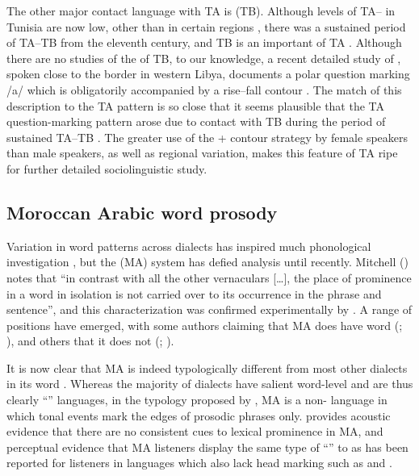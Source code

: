 \documentclass[output=paper]{langsci/langscibook}
\begin{document}
The other major contact language with TA is   (TB). Although levels of TA--  in Tunisia are now low, other than in certain regions \citep{Gabsi2011}, there was a sustained period of TA--TB  from the eleventh century, and TB is an important  of TA \citep{Daoud2007}. Although there are no studies of the  of TB, to our knowledge, a recent detailed study of  , spoken close to the  border in western Libya, documents a polar question marking  /a/ which is obligatorily accompanied by a rise--fall contour \citep{Gussenhoven2017}. The match of this description to the TA pattern is so close that it seems plausible that the TA question-marking pattern arose due to contact with TB during the period of sustained TA--TB . The greater use of the  + contour strategy by female speakers than male speakers, as well as regional variation, makes this feature of TA ripe for further detailed sociolinguistic study.


 
 \subsection{Moroccan Arabic word prosody} \label{moroc}


Variation in word  patterns across  dialects has inspired much phonological investigation \citep{Watson2011stress}, but the   (MA)  system has defied analysis until recently. Mitchell (\citeyear[202]{Mitchell1993}) notes that “in contrast with all the other vernaculars […], the place of prominence in a word in isolation is not carried over to its occurrence in the phrase and sentence”, and this characterization was confirmed experimentally by \citet{Boudlal2001}. A range of positions have emerged, with some authors claiming that MA does have word  (\citealt{Benkirane1998}; \citealt{BurdinEtAl2014}), and others that it does not (\citealt{Maas2013}; \citealt{ElZarka2012}). 

It is now clear that MA is indeed typologically different from most other  dialects in its word . Whereas the majority of  dialects have salient word-level  and are thus clearly ``'' languages, in the typology proposed by \citet{Jun2005}, MA is a non- language in which tonal events mark the edges of prosodic phrases only. \citet{Bruggeman2018} provides acoustic evidence that there are no consistent cues to lexical prominence in MA, and perceptual evidence that MA listeners display the same type of ``'' to  as has been reported for listeners in languages which also lack head marking such as  \citep{DupouxPeperkamp2001} and  \citep{RahmaniRietveldGussenhoven2015}.
\end{document}
